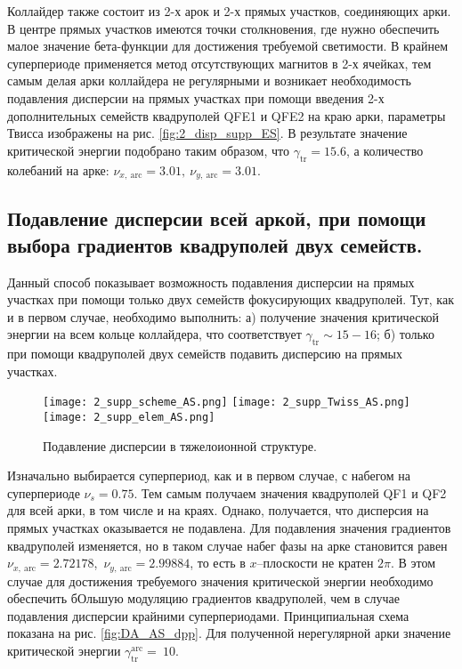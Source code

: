 \par Коллайдер также состоит из 2-х арок и 2-х прямых участков, соединяющих арки. В центре прямых участков имеются точки столкновения, где нужно обеспечить малое значение бета-функции для достижения требуемой светимости. В крайнем суперпериоде применяется метод отсутствующих магнитов в 2-х ячейках, тем самым делая арки коллайдера не регулярными и возникает необходимость подавления дисперсии на прямых участках при помощи введения 2-х дополнительных семейств квадруполей QFE1 и QFE2 на краю арки, параметры Твисса изображены на рис. \ref{fig:2_disp_supp_ES}. В результате значение критической энергии подобрано таким образом, что $\gamma_{\text{tr}}=15.6$, а количество колебаний на арке: $\nu_{x,\ \text{arc}}=3.01,\ \nu_{y,\ \text{arc}}=3.01$.

\subsection{Подавление дисперсии всей аркой, при помощи выбора градиентов квадруполей двух семейств.}\label{subsec:transition_variation/methods/disp_supperssion_AS}	

Данный способ показывает возможность подавления дисперсии на прямых участках при помощи только двух семейств фокусирующих квадруполей. Тут, как и в первом случае, необходимо выполнить:
	а) получение значения критической энергии на всем кольце коллайдера, что соответствует $\gamma_{\text{tr}}\sim15-16$;
	б) только при помощи квадруполей двух семейств подавить дисперсию на прямых участках.

\begin{figure} [h!]
	\center
	\texttt{[image: 2\_supp\_scheme\_AS.png]}
	\texttt{[image: 2\_supp\_Twiss\_AS.png]}
	\texttt{[image: 2\_supp\_elem\_AS.png]}
	\caption{Подавление дисперсии в тяжелоионной структуре.}
	\label{fig:2_disp_supp_AS}
\end{figure}
	
\par Изначально выбирается суперпериод, как и в первом случае, с набегом на суперпериоде $\nu_s=0.75$. Тем самым получаем значения квадруполей QF1 и QF2 для всей арки, в том числе и на краях. Однако, получается, что дисперсия на прямых участках оказывается не подавлена. Для подавления значения градиентов квадруполей изменяется, но в таком случае набег фазы на арке становится равен $\nu_{x,\ \text{arc}}=2.72178$,\ $\nu_{y,\ \text{arc}}=2.99884$, то есть в $x$–плоскости не кратен $2\pi$. В этом случае для достижения требуемого значения критической энергии необходимо обеспечить бОльшую модуляцию градиентов квадруполей, чем в случае подавления дисперсии крайними суперпериодами. Принципиальная схема показана на рис. \ref{fig:DA_AS_dpp}. Для полученной нерегулярной арки значение критической энергии $\gamma_{\text{tr}}^{\text{arc}}=\ 10$.

